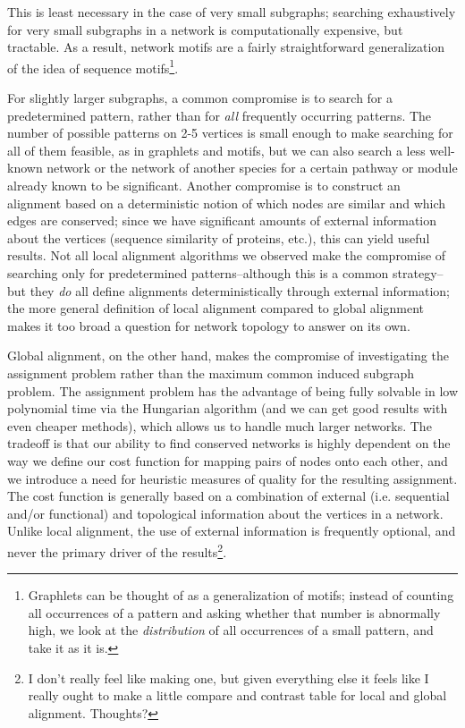 \documentclass[12pt]{thesis}
\theoremstyle{plain}
\theoremstyle{definition}
\theoremstyle{remark}
\begin{document}
This is least necessary in the case of very small subgraphs; searching exhaustively for very small subgraphs in a network is computationally expensive, but tractable. As a result, network motifs are a fairly straightforward generalization of the idea of sequence motifs\footnote{Graphlets can be thought of as a generalization of motifs; instead of counting all occurrences of a pattern and asking whether that number is abnormally high, we look at the \textit{distribution} of all occurrences of a small pattern, and take it as it is.}.

For slightly larger subgraphs, a common compromise is to search for a predetermined pattern, rather than for \textit{all} frequently occurring patterns. The number of possible patterns on 2-5 vertices is small enough to make searching for all of them feasible, as in graphlets and motifs, but we can also search a less well-known network or the network of another species for a certain pathway or module already known to be significant. Another compromise is to construct an alignment based on a deterministic notion of which nodes are similar and which edges are conserved; since we have significant amounts of external information about the vertices (sequence similarity of proteins, etc.), this can yield useful results. Not all local alignment algorithms we observed make the compromise of searching only for predetermined patterns--although this is a common strategy--but they \textit{do} all define alignments deterministically through external information; the more general definition of local alignment compared to global alignment makes it too broad a question for network topology to answer on its own.

Global alignment, on the other hand, makes the compromise of investigating the assignment problem rather than the maximum common induced subgraph problem. The assignment problem has the advantage of being fully solvable in low polynomial time via the Hungarian algorithm (and we can get good results with even cheaper methods), which allows us to handle much larger networks. The tradeoff is that our ability to find conserved networks is highly dependent on the way we define our cost function for mapping pairs of nodes onto each other, and we introduce a need for heuristic measures of quality for the resulting assignment. The cost function is generally based on a combination of external (i.e. sequential and/or functional) and topological information about the vertices in a network. Unlike local alignment, the use of external information is frequently optional, and never the primary driver of the results\footnote{I don't really feel like making one, but given everything else it feels like I really ought to make a little compare and contrast table for local and global alignment. Thoughts?}.
\end{document}
